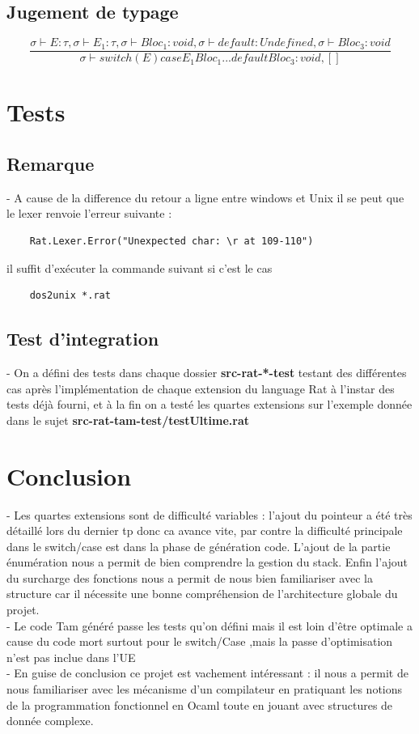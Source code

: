 \documentclass{article}
\begin{document}
\subsection{Jugement de typage}
\begin{equation}
    \frac{\sigma \vdash E : \tau, \sigma \vdash E_1 : \tau, \sigma \vdash Bloc_1: void, \sigma \vdash default : Undefined, \sigma \vdash Bloc_3 : void}
        {\sigma \vdash switch (E) case E_1 Bloc_1 ... default Bloc_3 : void,[]}
\end{equation}

\section{Tests}
\subsection{Remarque}
- A cause de la difference du retour a ligne entre windows et Unix il se peut que le lexer renvoie l'erreur suivante :
\begin{verbatim}
    Rat.Lexer.Error("Unexpected char: \r at 109-110")
\end{verbatim}
il suffit d'exécuter la commande suivant si c'est le cas 
\begin{verbatim}
    dos2unix *.rat
\end{verbatim}
\subsection{Test d'integration}
- On a défini des tests dans chaque dossier \textbf{src-rat-*-test} testant des différentes cas après l'implémentation de chaque extension du language Rat à
l'instar des tests déjà fourni, et à la fin on a testé les quartes extensions sur l'exemple donnée dans le sujet \textbf{src-rat-tam-test/testUltime.rat}
\section{Conclusion}
- Les quartes extensions sont de difficulté variables : l'ajout du pointeur a été très détaillé lors du dernier tp donc ca avance vite, par contre 
la difficulté principale dans le switch/case est dans la phase de génération code. L'ajout de la partie énumération nous a permit de bien comprendre
la gestion du stack. Enfin l'ajout du surcharge des fonctions nous a permit de nous bien familiariser 
avec la structure car il nécessite une bonne compréhension de l'architecture globale du projet. \\
- Le code Tam généré passe les tests qu'on défini mais il est loin d'être optimale a cause du code mort surtout pour le switch/Case
,mais la passe d'optimisation n'est pas inclue dans l'UE  \\  
- En guise de conclusion ce projet est vachement intéressant : il nous a permit de nous familiariser avec les mécanisme d'un compilateur
en pratiquant les notions de la programmation fonctionnel en Ocaml toute en jouant avec structures de donnée complexe. \\
\end{document}
